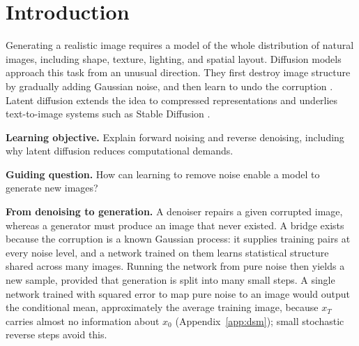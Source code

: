 \begin{abstract}
How can learning to remove noise enable a model to generate new images?
We study this question through two papers. Denoising Diffusion
Probabilistic Models (DDPM) corrupt images with Gaussian noise, train a
network to predict that noise, and generate by denoising pure noise over
many small steps. Latent Diffusion Models (LDM) run the same process in
the compressed latent space of an autoencoder, which makes each step
cheaper, and condition it on text or other inputs through
cross-attention. We derive the forward process, DDPM's variational
objective, and its simplified noise-prediction loss, and illustrate
forward noising with a worked one-dimensional calculation and a
five-level image sequence. With pretrained checkpoints and no training of
our own, we compare pixel and latent generators on LSUN Churches (50 DDIM
steps, one T4 GPU). The latent model needs a median $2.44$~s per image
versus $6.10$~s, but its peak tensor allocation is higher, $1.68$ versus
$0.75$~GiB. Saved trajectories for five ImageNet classes show structure
emerging as noise is removed, and a small Stable Diffusion test shows that
a prompt edit can change an object's color without reversing its
left--right position. We relate these observations to published
results and to limits set by training data, copyright, and bias.
\end{abstract}

\section{Introduction}\label{sec:intro}
Generating a realistic image requires a model of the whole distribution
of natural images, including shape, texture, lighting, and spatial layout.
Diffusion models approach this task from an unusual direction. They first
destroy image structure by gradually adding Gaussian noise, and then learn
to undo the corruption \cite{sohl2015diffusion,ho2020ddpm}. Latent
diffusion extends the idea to compressed representations and underlies
text-to-image systems such as Stable Diffusion
\cite{rombach2022ldm,compvis2022sd14}.

\smallskip\noindent\textbf{Learning objective.} Explain forward noising
and reverse denoising, including why latent diffusion reduces
computational demands.

\smallskip\noindent\textbf{Guiding question.} How can learning to remove
noise enable a model to generate new images?

\smallskip\noindent\textbf{From denoising to generation.}
A denoiser repairs a given corrupted image, whereas a generator must
produce an image that never existed. A bridge exists because the
corruption is a known Gaussian process: it supplies training pairs at
every noise level, and a network trained on them learns statistical
structure shared across many images. Running the network from pure noise
then yields a new sample, provided that generation is split into many
small steps. A single network trained with squared error to map pure noise
to an image would output the conditional mean, approximately the average
training image, because $x_T$ carries almost no information about $x_0$
(Appendix~\ref{app:dsm}); small stochastic reverse steps avoid this.


